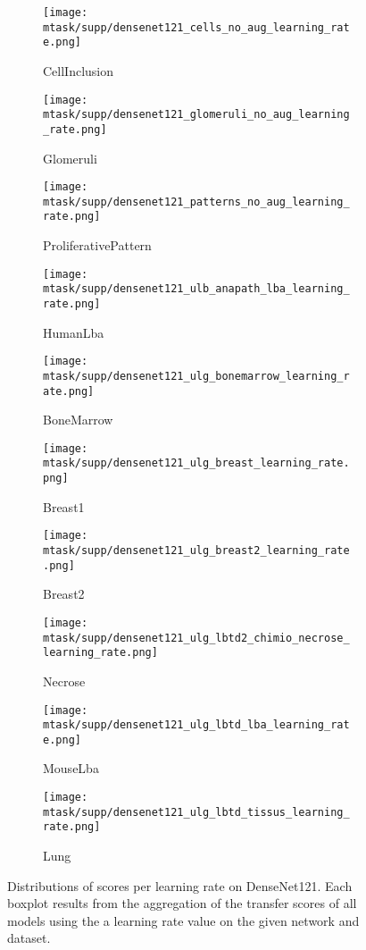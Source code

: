 \begin{figure*}[h]
  \centering
  \begin{subfigure}{0.48\textwidth}
    \centering
    \texttt{[image: mtask/supp/densenet121\_cells\_no\_aug\_learning\_rate.png]}
    \caption{CellInclusion}
    \end{subfigure}
  \begin{subfigure}{0.48\textwidth}
    \centering
    \texttt{[image: mtask/supp/densenet121\_glomeruli\_no\_aug\_learning\_rate.png]}\\
    \caption{Glomeruli}
  \end{subfigure}
  \begin{subfigure}{0.48\textwidth}
    \centering
    \texttt{[image: mtask/supp/densenet121\_patterns\_no\_aug\_learning\_rate.png]}
    \caption{ProliferativePattern}
  \end{subfigure}
  \begin{subfigure}{0.48\textwidth}
    \centering
    \texttt{[image: mtask/supp/densenet121\_ulb\_anapath\_lba\_learning\_rate.png]}\\
    \caption{HumanLba}
  \end{subfigure}
  \begin{subfigure}{0.48\textwidth}
    \centering
    \texttt{[image: mtask/supp/densenet121\_ulg\_bonemarrow\_learning\_rate.png]}
    \caption{BoneMarrow}
  \end{subfigure}
  \begin{subfigure}{0.48\textwidth}
    \centering
    \texttt{[image: mtask/supp/densenet121\_ulg\_breast\_learning\_rate.png]}\\
    \caption{Breast1}
  \end{subfigure}
  \begin{subfigure}{0.48\textwidth}
    \centering
    \texttt{[image: mtask/supp/densenet121\_ulg\_breast2\_learning\_rate.png]}
    \caption{Breast2}
  \end{subfigure}
  \begin{subfigure}{0.48\textwidth}
    \centering
    \texttt{[image: mtask/supp/densenet121\_ulg\_lbtd2\_chimio\_necrose\_learning\_rate.png]}\\
    \caption{Necrose}
  \end{subfigure}
  \begin{subfigure}{0.48\textwidth}
    \centering
    \texttt{[image: mtask/supp/densenet121\_ulg\_lbtd\_lba\_learning\_rate.png]}
    \caption{MouseLba}
  \end{subfigure}
  \begin{subfigure}{0.48\textwidth}
    \centering
    \texttt{[image: mtask/supp/densenet121\_ulg\_lbtd\_tissus\_learning\_rate.png]}
    \caption{Lung}
  \end{subfigure}
  \caption{Distributions of scores per learning rate on DenseNet121. Each boxplot results from the aggregation of the transfer scores of all models using the a learning rate value on the given network and dataset.}
  \label{app:mtask:fig:lr_densenet}
\end{figure*}

